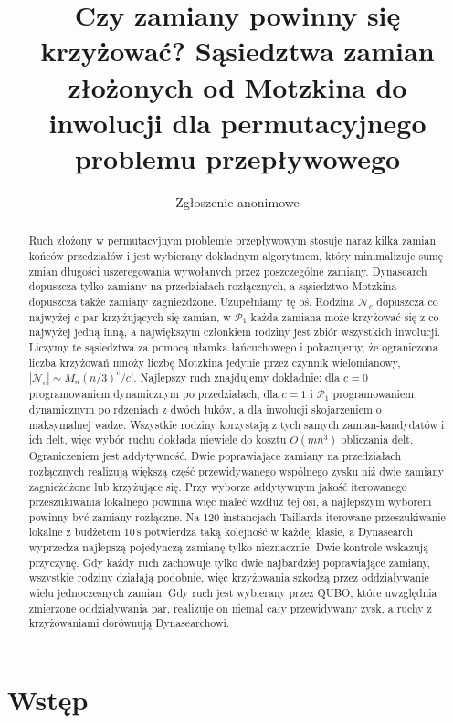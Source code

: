 \documentclass[10pt,twocolumn]{article}
\title{Czy zamiany powinny się krzyżować? Sąsiedztwa zamian złożonych od Motzkina do inwolucji dla permutacyjnego problemu przepływowego}
\author{Zgłoszenie anonimowe}
\date{}
\newcommand{\N}{\mathcal{N}}
\newcommand{\Pa}{\mathcal{P}}
\begin{document}
\maketitle

\begin{abstract}
Ruch złożony w permutacyjnym problemie przepływowym stosuje naraz kilka
zamian końców przedziałów i jest wybierany dokładnym algorytmem, który
minimalizuje sumę zmian długości uszeregowania wywołanych przez
poszczególne zamiany. Dynasearch dopuszcza tylko zamiany na przedziałach
rozłącznych, a sąsiedztwo Motzkina dopuszcza także zamiany zagnieżdżone.
Uzupełniamy tę oś. Rodzina $\N_c$ dopuszcza co najwyżej $c$ par
krzyżujących się zamian, w $\Pa_1$ każda zamiana może krzyżować się
z co najwyżej jedną inną, a największym członkiem rodziny jest zbiór
wszystkich inwolucji. Liczymy te sąsiedztwa za pomocą ułamka łańcuchowego
i pokazujemy, że ograniczona liczba krzyżowań mnoży liczbę Motzkina
jedynie przez czynnik wielomianowy, $|\N_c|\sim M_n (n/3)^c/c!$.
Najlepszy ruch znajdujemy dokładnie: dla $c=0$ programowaniem dynamicznym
po przedziałach, dla $c=1$ i $\Pa_1$ programowaniem dynamicznym po
rdzeniach z dwóch łuków, a dla inwolucji skojarzeniem o maksymalnej wadze.
Wszystkie rodziny korzystają z tych samych zamian-kandydatów i ich delt,
więc wybór ruchu dokłada niewiele do kosztu $O(mn^3)$ obliczania delt.
Ograniczeniem jest addytywność. Dwie poprawiające zamiany na przedziałach
rozłącznych realizują większą część przewidywanego wspólnego zysku niż
dwie zamiany zagnieżdżone lub krzyżujące się. Przy wyborze addytywnym
jakość iterowanego przeszukiwania lokalnego powinna więc maleć wzdłuż tej
osi, a najlepszym wyborem powinny być zamiany rozłączne. Na 120
instancjach Taillarda iterowane przeszukiwanie lokalne z budżetem
$10$\,s potwierdza taką kolejność w każdej klasie, a Dynasearch wyprzedza
najlepszą pojedynczą zamianę tylko nieznacznie. Dwie kontrole wskazują
przyczynę. Gdy każdy ruch zachowuje tylko dwie najbardziej poprawiające
zamiany, wszystkie rodziny działają podobnie, więc krzyżowania szkodzą
przez oddziaływanie wielu jednoczesnych zamian. Gdy ruch jest wybierany
przez QUBO, które uwzględnia zmierzone oddziaływania par, realizuje on
niemal cały przewidywany zysk, a ruchy z krzyżowaniami dorównują
Dynasearchowi.
\end{abstract}

\section{Wstęp}
\end{document}
